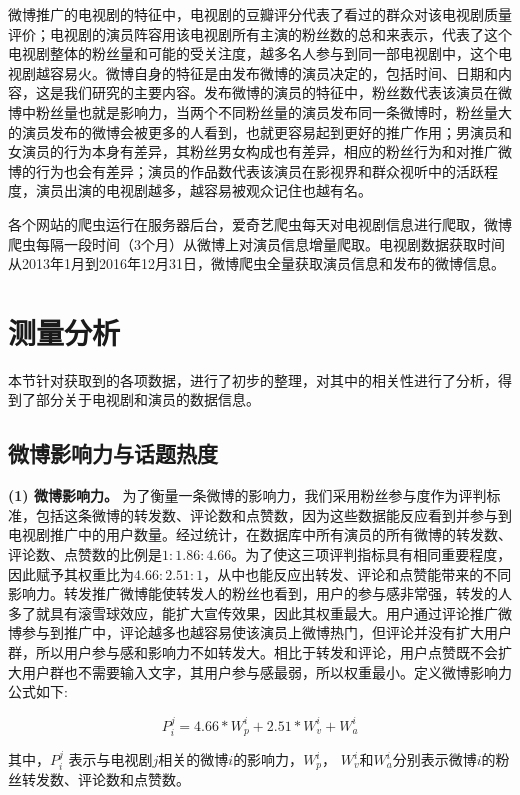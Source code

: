 微博推广的电视剧的特征中，电视剧的豆瓣评分代表了看过的群众对该电视剧质量评价；电视剧的演员阵容用该电视剧所有主演的粉丝数的总和来表示，代表了这个电视剧整体的粉丝量和可能的受关注度，越多名人参与到同一部电视剧中，这个电视剧越容易火。微博自身的特征是由发布微博的演员决定的，包括时间、日期和内容，这是我们研究的主要内容。发布微博的演员的特征中，粉丝数代表该演员在微博中粉丝量也就是影响力，当两个不同粉丝量的演员发布同一条微博时，粉丝量大的演员发布的微博会被更多的人看到，也就更容易起到更好的推广作用；男演员和女演员的行为本身有差异，其粉丝男女构成也有差异，相应的粉丝行为和对推广微博的行为也会有差异；演员的作品数代表该演员在影视界和群众视听中的活跃程度，演员出演的电视剧越多，越容易被观众记住也越有名。

各个网站的爬虫运行在服务器后台，爱奇艺爬虫每天对电视剧信息进行爬取，微博爬虫每隔一段时间（3个月）从微博上对演员信息增量爬取。电视剧数据获取时间从2013年1月到2016年12月31日，微博爬虫全量获取演员信息和发布的微博信息。

\section{测量分析}

本节针对获取到的各项数据，进行了初步的整理，对其中的相关性进行了分析，得到了部分关于电视剧和演员的数据信息。

\subsection{微博影响力与话题热度}

\textbf{(1) 微博影响力。}
为了衡量一条微博的影响力，我们采用粉丝参与度作为评判标准，包括这条微博的转发数、评论数和点赞数，因为这些数据能反应看到并参与到电视剧推广中的用户数量。经过统计，在数据库中所有演员的所有微博的转发数、评论数、点赞数的比例是${1: 1.86: 4.66}$。为了使这三项评判指标具有相同重要程度，因此赋予其权重比为${4.66: 2.51: 1}$，从中也能反应出转发、评论和点赞能带来的不同影响力。转发推广微博能使转发人的粉丝也看到，用户的参与感非常强，转发的人多了就具有滚雪球效应，能扩大宣传效果，因此其权重最大。用户通过评论推广微博参与到推广中，评论越多也越容易使该演员上微博热门，但评论并没有扩大用户群，所以用户参与感和影响力不如转发大。相比于转发和评论，用户点赞既不会扩大用户群也不需要输入文字，其用户参与感最弱，所以权重最小。定义微博影响力公式如下:

\begin{equation}P_i^j = 4.66 * W_p^i + 2.51 * W_v^i + W_a^i\end{equation}

其中，$P_i^j$ 表示与电视剧$j$相关的微博$i$的影响力，$W_p^i$， $W_v^i$和$W_a^i$分别表示微博$i$的粉丝转发数、评论数和点赞数。

